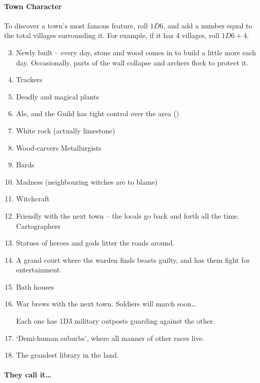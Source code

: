 \begin{multicols}{2}
\paragraph{Town Character}
\label{mapCharacter}

To discover a town's most famous feature, roll $1D6$, and add a number equal to the total \glspl{village} surrounding it.
For example, if it has 4 \glspl{village}, roll $1D6+4$.

\begin{enumerate}
\setcounter{enumi}{2}
  \item
  Newly built -- every day, stone and wood comes in to build a little more each day.
  Occasionally, parts of the wall collapse and archers flock to protect it.
  \item
  Trackers
  \item
  Deadly and magical plants
  \item
  Ale, and the Guild has tight control over the area ()
  \item
  White rock (actually limestone)
  \item
  \ifodd\value{r4}
    Wood-carvers
  \else
    Metallurgists
  \fi
  \item
 Bards
  \item
  Madness (neighbouring witches are to blame)
  \item
  Witchcraft
  \item
  \ifodd\value{r4}
  Friendly with the next town -- the locals go back and forth all the
    time.
  \else
    Cartographers
  \fi
  \item
  Statues of heroes and gods litter the roads around.
  \item
  A grand \gls{court} where the \gls{warden} finds beasts guilty, and has them fight for entertainment.
  \item
  Bath houses
  \item
  War brews with the next town.
  Soldiers will march soon\ldots

  Each one has 1D3 military outposts guarding against the other.
  \item
  `Demi-human suburbs', where all manner of other races live.
  \item
  The grandest library in the land.
\end{enumerate}

\paragraph{They call it\ldots{}}


\end{multicols}
